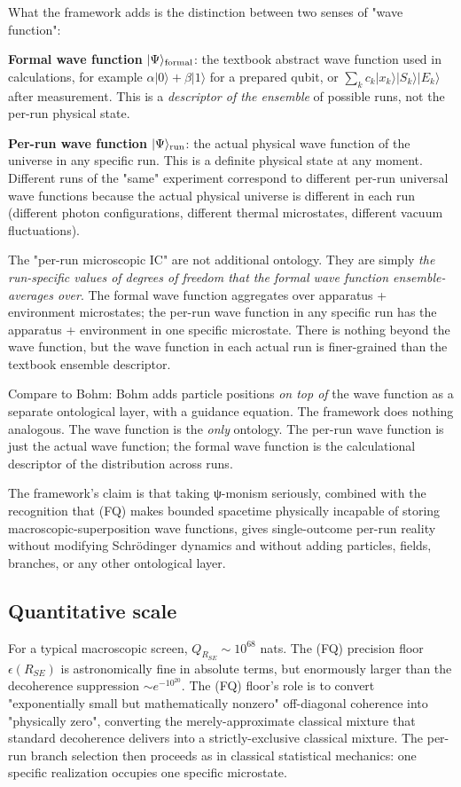 \documentclass[11pt,a4paper]{article}
\begin{document}
What the framework adds is the distinction between two senses of "wave function":

\textbf{Formal wave function} $|\Psi\rangle_{\rm formal}$: the textbook abstract wave function used in calculations, for example $\alpha|0\rangle + \beta|1\rangle$ for a prepared qubit, or $\sum_k c_k |x_k\rangle|S_k\rangle|E_k\rangle$ after measurement. This is a \emph{descriptor of the ensemble} of possible runs, not the per-run physical state.

\textbf{Per-run wave function} $|\Psi\rangle_{\rm run}$: the actual physical wave function of the universe in any specific run. This is a definite physical state at any moment. Different runs of the "same" experiment correspond to different per-run universal wave functions because the actual physical universe is different in each run (different photon configurations, different thermal microstates, different vacuum fluctuations).

The "per-run microscopic IC" are not additional ontology. They are simply \emph{the run-specific values of degrees of freedom that the formal wave function ensemble-averages over}. The formal wave function aggregates over apparatus + environment microstates; the per-run wave function in any specific run has the apparatus + environment in one specific microstate. There is nothing beyond the wave function, but the wave function in each actual run is finer-grained than the textbook ensemble descriptor.

Compare to Bohm: Bohm adds particle positions \emph{on top of} the wave function as a separate ontological layer, with a guidance equation. The framework does nothing analogous. The wave function is the \emph{only} ontology. The per-run wave function is just the actual wave function; the formal wave function is the calculational descriptor of the distribution across runs.

The framework's claim is that taking ψ-monism seriously, combined with the recognition that (FQ) makes bounded spacetime physically incapable of storing macroscopic-superposition wave functions, gives single-outcome per-run reality without modifying Schrödinger dynamics and without adding particles, fields, branches, or any other ontological layer.

\subsection{Quantitative scale}

For a typical macroscopic screen, $Q_{R_{SE}} \sim 10^{68}$ nats. The (FQ) precision floor $\epsilon(R_{SE})$ is astronomically fine in absolute terms, but enormously larger than the decoherence suppression $\sim e^{-10^{20}}$. The (FQ) floor's role is to convert "exponentially small but mathematically nonzero" off-diagonal coherence into "physically zero", converting the merely-approximate classical mixture that standard decoherence delivers into a strictly-exclusive classical mixture. The per-run branch selection then proceeds as in classical statistical mechanics: one specific realization occupies one specific microstate.
\end{document}
